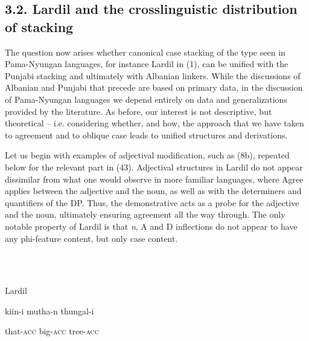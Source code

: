 \documentclass[output=paper]{langsci/langscibook}
\begin{document}
\subsection{ 3.2. Lardil and the crosslinguistic distribution of stacking}

\begin{styleSfondomedioiColorexxi}
The question now arises whether canonical case stacking of the type seen in Pama-Nyungan languages, for instance Lardil in (1), can be unified with the Punjabi stacking and ultimately with Albanian linkers. While the discussions of Albanian and Punjabi that precede are based on primary data, in the discussion of Pama-Nyungan languages we depend entirely on data and generalizations provided by the literature. As before, our interest is not descriptive, but theoretical – i.e. considering whether, and how, the approach that we have taken to agreement and to oblique case leads to unified structures and derivations.
\end{styleSfondomedioiColorexxi}

\begin{styleSfondomedioiColorexxi}
  Let us begin with examples of adjectival modification, such as (8b), repeated below for the relevant part in (43). Adjectival structures in Lardil do not appear dissimilar from what one would observe in more familiar languages, where Agree applies between the adjective and the noun, as well as with the determiners and quantifiers of the DP. Thus, the demonstrative acts as a probe for the adjective and the noun, ultimately ensuring agreement all the way through. The only notable property of Lardil is that \textit{n}, A and D inflections do not appear to have any phi-feature content, but only case content.
\end{styleSfondomedioiColorexxi}

\begin{styleSfondomedioiColorexi}
\ea%
    \label{ex:key:43}
    \gll\\
        \\
    \glt
    \z

          Lardil
\end{styleSfondomedioiColorexi}

\begin{styleSfondomedioiColorexi}
kiin-i     mutha-n   thungal-i 
\end{styleSfondomedioiColorexi}

\begin{styleSfondomedioiColorexi}
that-\textsc{acc}   big-\textsc{acc}     tree-\textsc{acc}     
\end{styleSfondomedioiColorexi}
\end{document}
